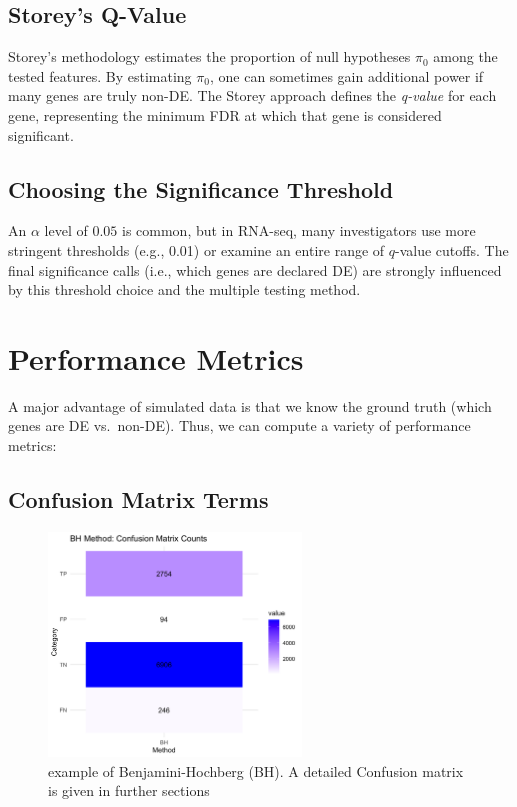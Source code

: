\documentclass[12pt]{article}
\begin{document}
\subsection{Storey’s Q-Value}
Storey’s methodology \cite{storey2003statistical} estimates the proportion of null hypotheses $\pi_0$ among the tested features. By estimating $\pi_0$, one can sometimes gain additional power if many genes are truly non-DE. The Storey approach defines the \emph{q-value} for each gene, representing the minimum FDR at which that gene is considered significant.

\subsection{Choosing the Significance Threshold}
An $\alpha$ level of $0.05$ is common, but in RNA-seq, many investigators use more stringent thresholds (e.g., 0.01) or examine an entire range of $q$-value cutoffs. The final significance calls (i.e., which genes are declared DE) are strongly influenced by this threshold choice and the multiple testing method.

\section{Performance Metrics}
\label{sec:metrics}

A major advantage of simulated data is that we know the ground truth (which genes are DE vs.\ non-DE). Thus, we can compute a variety of performance metrics:

\subsection{Confusion Matrix Terms}

\begin{figure}[h]
  \centering
  \includegraphics[width=0.6\textwidth]{figure/BHplot.png} %
  \caption{example of Benjamini-Hochberg (BH). A detailed Confusion matrix is given in further sections}  %
  \label{fig:confusionmatrix}
\end{figure}
\end{document}
